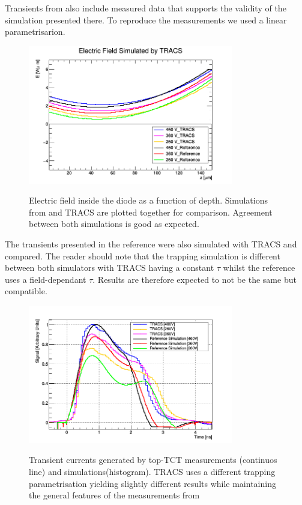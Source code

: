 Transients from \cite{Pholsen} also include measured data that supports the validity of the simulation presented there. To reproduce the measurements we used a linear parametrisarion.

\begin{figure}[H]
	\centering
	\includegraphics[width=0.8\textwidth]{Pohlsen_fields.png}
	\label{fig:CompFields}
	\caption{Electric field inside the diode as a function of depth. Simulations from \cite{Pohlsen} and TRACS are plotted together for comparison. Agreement between both simulations is good as expected.}
\end{figure}

The transients presented in the reference were also simulated with TRACS and compared. The reader should note that the trapping simulation is different between both simulators with TRACS having a constant $\tau$ whilst the reference uses a field-dependant $\tau$. Results are therefore expected to not be the same but compatible.

\begin{figure}[H]
	\centering
	\includegraphics[width=0.8\textwidth]{Pohlsen_scr.png}
	\label{fig:mues2}
	\caption{Transient currents generated by top-TCT measurements (continuos line) and simulations(histogram). TRACS uses a different trapping parametrisation yielding slightly different results while maintaining the general features of the measurements from \cite{Pohlsen}}
\end{figure}



